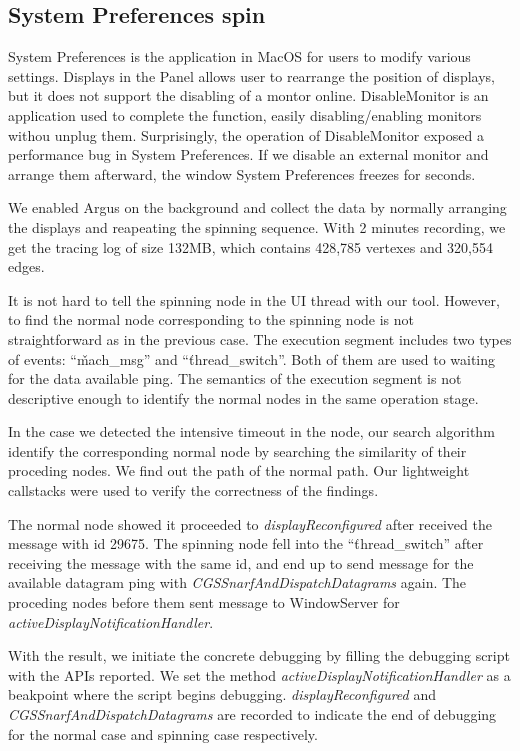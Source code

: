 \subsection{System Preferences spin}
System Preferences is the application in MacOS for users to modify various
settings.  Displays in the Panel allows user to rearrange the position of
displays, but it does not support the disabling of a montor online.
DisableMonitor is an application used to complete the function, easily
disabling/enabling  monitors withou unplug them.  Surprisingly, the operation
of DisableMonitor exposed a performance bug in System Preferences.  If we
disable an external monitor and arrange them afterward, the window System
Preferences freezes for seconds.

We enabled Argus on the background and collect the data by normally arranging
the displays and reapeating the spinning sequence.  With 2 minutes recording,
we get the tracing log of size 132MB, which contains 428,785 vertexes and
320,554 edges.

It is not hard to tell the spinning node in the UI thread with our tool.
However, to find the normal node corresponding to the spinning node is not
straightforward as in the previous case.  The execution segment includes two
types of events: ``\v{mach\_msg}'' and ``\v{thread\_switch}''.  Both of them
are used to waiting for the data available ping.  The semantics of the
execution segment is not descriptive enough to identify the normal nodes in the
same operation stage.

In the case we detected the intensive timeout in the node, our search algorithm
identify the corresponding normal node by searching the similarity of their
proceding nodes.  We find out the path of the normal path.
Our lightweight callstacks were used to verify the correctness of the findings.

The normal node showed it proceeded to \textit{displayReconfigured} after
received the message with id 29675.  The spinning node fell into the
``\v{thread\_switch}'' after receiving the message with the same id, and end up
to send message for the available datagram ping with
\textit{CGSSnarfAndDispatchDatagrams} again.  The proceding nodes before them
sent message to WindowServer for \textit{activeDisplayNotificationHandler}.

With the result, we initiate the concrete debugging by filling the debugging
script with the APIs reported.  We set the method
\textit{activeDisplayNotificationHandler} as a beakpoint where the script
begins debugging.  \textit{displayReconfigured} and
\textit{CGSSnarfAndDispatchDatagrams} are recorded to indicate the end of
debugging for the normal case and spinning case respectively.

